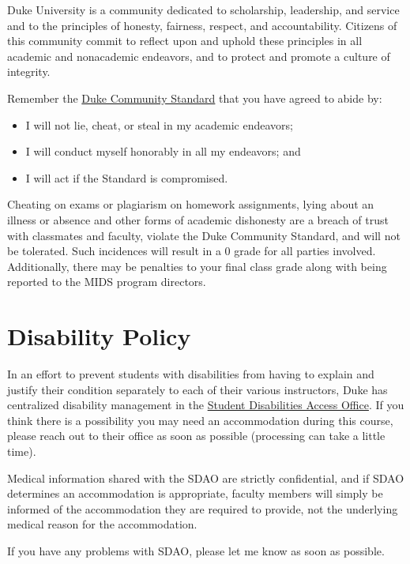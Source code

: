 \documentclass[12pt]{article}
\begin{document}
Duke University is a community dedicated to scholarship, leadership, and service and to the principles of honesty, fairness, respect, and accountability. Citizens of this community commit to reflect upon and uphold these principles in all academic and nonacademic endeavors, and to protect and promote a culture of integrity.

Remember the \href{https://studentaffairs.duke.edu/conduct/about-us/duke-community-standard}{Duke Community Standard} that you have agreed to abide by:

\begin{itemize}
	\item I will not lie, cheat, or steal in my academic endeavors;
	\item I will conduct myself honorably in all my endeavors; and
	\item I will act if the Standard is compromised.
\end{itemize}

Cheating on exams or plagiarism on homework assignments, lying about an illness or absence and other forms of academic dishonesty are a breach of trust with classmates and faculty, violate the Duke Community Standard, and will not be tolerated. Such incidences will result in a 0 grade for all parties involved. Additionally, there may be penalties to your final class grade along with being reported to the MIDS program directors.

\section{Disability Policy}

In an effort to prevent students with disabilities from having to explain and justify their condition separately to each of their various instructors, Duke has centralized disability management in the \href{https://access.duke.edu/students}{Student Disabilities Access Office}. If you think there is a possibility you may need an accommodation during this course, please reach out to their office as soon as possible (processing can take a little time).

Medical information shared with the SDAO are strictly confidential, and if SDAO determines an accommodation is appropriate, faculty members will simply be informed of the accommodation they are required to provide, not the underlying medical reason for the accommodation.

If you have any problems with SDAO, please let me know as soon as possible.
\end{document}

